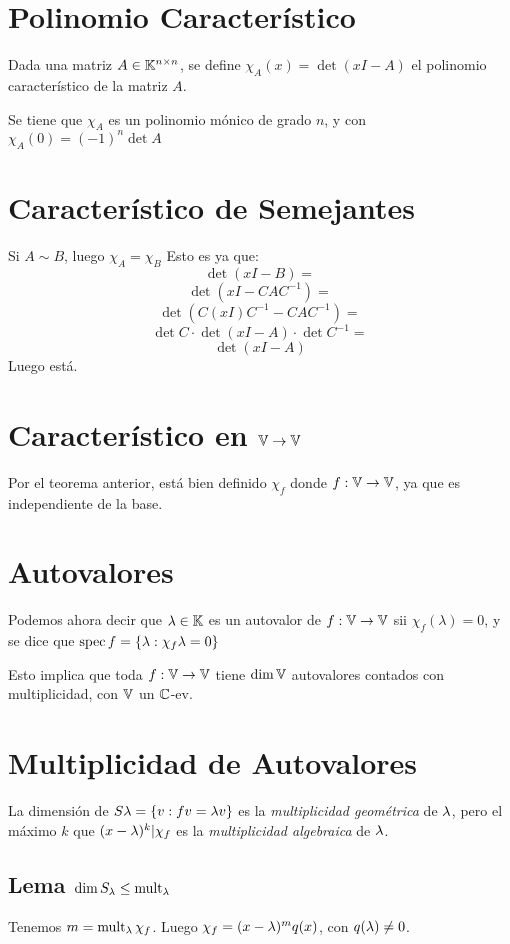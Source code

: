 \documentclass{article}
\begin{document}
\section*{Polinomio Característico}
Dada una matriz $A \in \mathbb{K}^{n \times n}$, se define $\chi_A(x) = \det (xI - A)$ el polinomio característico de la matriz $A$.

Se tiene que $\chi_A$ es un polinomio mónico de grado $n$, y con $\chi_A(0) = (-1)^n \det A$

\section*{Característico de Semejantes}
Si $A \sim B$, luego $\chi_A = \chi_B$
Esto es ya que:
\[
	\det (xI - B) =
\]
\[
	\det (xI - CAC^{-1}) =
\]
\[
	\det (C(xI)C^{-1} - CAC^{-1}) =
\]
\[
	\det C \cdot \det (xI - A) \cdot \det C^{-1}=
\]
\[
	\det (xI - A)
\]
Luego está.

\section*{Característico en $\mathbb{V} \to \mathbb{V}$}
Por el teorema anterior, está bien definido $\chi_f$ donde $f : \mathbb{V} \to \mathbb{V}$, ya que es independiente de la base.

\section*{Autovalores}
Podemos ahora decir que $\lambda \in \mathbb{K}$ es un autovalor de $f : \mathbb{V} \to \mathbb{V}$ sii $\chi_f(\lambda) = 0$, y se dice que $\operatorname{spec} f = \{\lambda : \chi_f \lambda = 0 \}$

Esto implica que toda $f : \mathbb{V} \to \mathbb{V}$ tiene $\dim \mathbb{V}$ autovalores contados con multiplicidad, con $\mathbb{V}$ un $\mathbb{C}$-ev.

\section*{Multiplicidad de Autovalores}
La dimensión de $S\lambda = \{v : fv = \lambda v\}$ es la \emph{multiplicidad geométrica} de $\lambda$, pero el máximo $k$ que $(x - \lambda)^k | \chi_f$ es la \emph{multiplicidad algebraica} de $\lambda$.

\subsection*{Lema $\dim S_\lambda \leq\operatorname{mult}_\lambda$}
Tenemos $m = \operatorname{mult}_\lambda \chi_f$. Luego $\chi_f = (x - \lambda)^mq(x)$, con $q(\lambda) \neq 0$.
\end{document}
